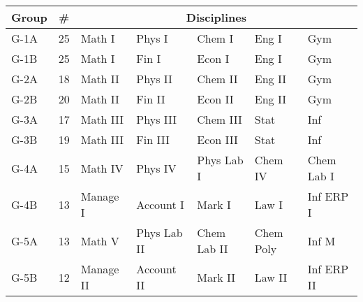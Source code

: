 \begin{tabular}{lclllll}
  Group & \# & \multicolumn{5}{c}{Disciplines} \\\hline\hline
  G-1A  & 25 & Math I     & Phys I        & Chem I          & Eng I       & Gym         \\
  G-1B  & 25 & Math I     & Fin I         & Econ I          & Eng I       & Gym         \\\hline
  G-2A  & 18 & Math II    & Phys II       & Chem II         & Eng II      & Gym         \\
  G-2B  & 20 & Math II    & Fin II        & Econ II         & Eng II      & Gym         \\\hline
  G-3A  & 17 & Math III   & Phys III      & Chem III        & Stat        & Inf         \\
  G-3B  & 19 & Math III   & Fin III       & Econ III        & Stat        & Inf         \\\hline
  G-4A  & 15 & Math IV    & Phys IV       & Phys Lab I      & Chem IV     & Chem Lab I \\
  G-4B  & 13 & Manage I   & Account I     & Mark I          & Law I       & Inf ERP I   \\\hline
  G-5A  & 13 & Math V     & Phys Lab II   & Chem Lab II     & Chem Poly   & Inf M       \\
  G-5B  & 12 & Manage II  & Account II    & Mark II         & Law II      & Inf ERP II  \\\hline
\end{tabular}
